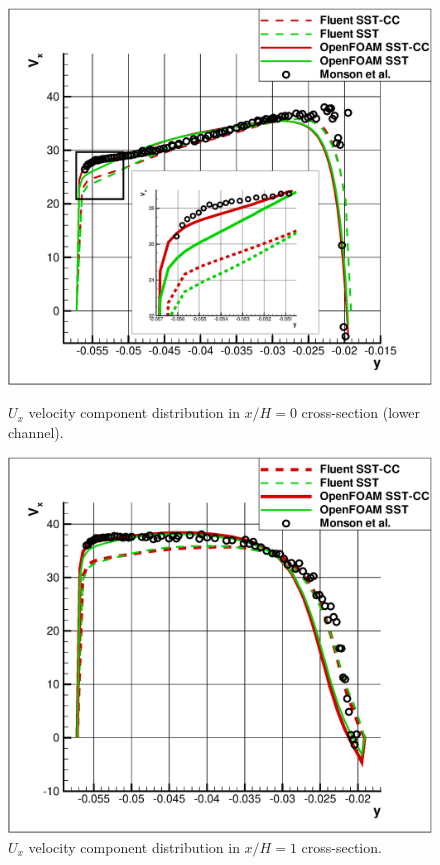 \documentclass[a4paper]{jpconf}
\begin{document}
\begin{figure}[ht]
	\vspace{-1em}	
	\begin{minipage}{0.475\linewidth}
		\includegraphics[scale=0.33]{xh0down}
		\caption{$U_x$ velocity component distribution in $x/H=0$ cross-section (lower channel).}
		\label{fig:x0down}
	\end{minipage}
	\hspace{0.5em}
	\begin{minipage}{0.475\linewidth}
		\includegraphics[scale=0.33]{xh1down}
		\caption{$U_x$ velocity component distribution in $x/H=1$ cross-section.}
		\label{fig:x1down}
	\end{minipage}
\end{figure}
\end{document}
